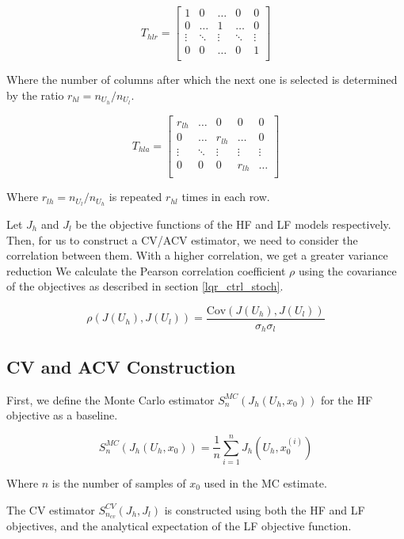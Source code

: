 \documentclass{article}
\begin{document}
$$
T_{hlr} =
\begin{bmatrix}
  1 & 0 & \ldots & 0 & 0 \\
  0 & \ldots & 1 & \ldots & 0 \\
  \vdots & \ddots & \vdots & \ddots & \vdots \\
  0 & 0 & \ldots & 0 & 1 \\
\end{bmatrix}
$$

Where the number of columns after which the next one is selected is determined by the ratio $r_{hl} = n_{U_h} / n_{U_l}$.

$$
T_{hla} =
\begin{bmatrix}
  r_{lh} & \ldots & 0 & 0 & 0 \\
  0 & \ldots & r_{lh} & \ldots & 0 \\
  \vdots & \ddots & \vdots & \vdots & \vdots \\
  0 & 0 & 0 & r_{lh} & \ldots \\
\end{bmatrix}
$$

Where $r_{lh} = n_{U_l} / n_{U_h}$ is repeated $r_{hl}$ times in each row.

Let $J_h$ and $J_l$ be the objective functions of the HF and LF models respectively. Then, for us to construct a
CV/ACV estimator, we need to consider the correlation between them. With a higher correlation, we get a greater variance reduction
We calculate the Pearson correlation coefficient $\rho$ using the covariance of the objectives
as described in section \ref{lqr_ctrl_stoch}.

\begin{equation}
  \rho(J(U_h), J(U_l)) = \frac{\text{Cov}(J(U_h), J(U_l))}{\sigma_h \sigma_l}
\end{equation}

\subsection{CV and ACV Construction}

First, we define the Monte Carlo estimator $S_n^{MC}(J_h(U_h, x_0))$ for the HF objective as a baseline.

$$
S_n^{MC}(J_h(U_h, x_0)) = \frac{1}{n} \sum_{i=1}^{n} J_h(U_h, x_0^{(i)})
$$

Where $n$ is the number of samples of $x_0$ used in the MC estimate.

The CV estimator $S_{n_{cv}}^{CV}(J_h, J_l)$ is constructed using both the HF and LF objectives, and the
analytical expectation of the LF objective function.
\end{document}
